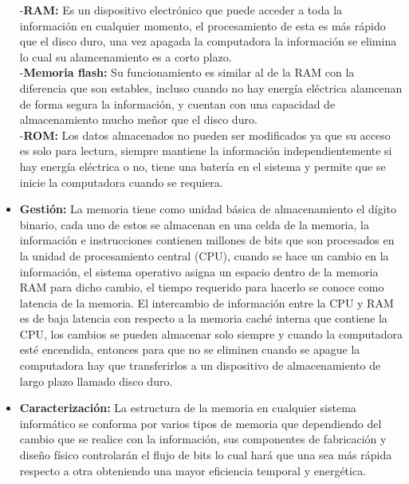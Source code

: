 \documentclass{article}
\begin{document}
\begin{flushleft}
\begin{itemize}
        -\textbf{RAM:} Es un dispositivo electrónico que puede acceder a toda la información en cualquier momento, el procesamiento de esta es más rápido que el disco duro, una vez apagada la computadora la información se elimina lo cual su alamcenamiento es a corto plazo.\\
        -\textbf{Memoria flash:} Su funcionamiento es similar al de la RAM con la diferencia que son estables, incluso cuando no hay energía eléctrica alamcenan de forma segura la información, y cuentan con una capacidad de almacenamiento mucho meñor que el disco duro.\\
        -\textbf{ROM:} Los datos almacenados no pueden ser modificados ya que su acceso es solo para lectura, siempre mantiene la información independientemente si hay energía eléctrica o no, tiene una batería en el sistema y permite que se inicie la computadora cuando se requiera.\\
        \item \textbf{Gestión:} La memoria tiene como unidad básica de almacenamiento el dígito binario, cada uno de estos se almacenan en una celda de la memoria, la información e instrucciones contienen millones de bits que son procesados en la unidad de procesamiento central (CPU), cuando se hace un cambio en la información, el sistema operativo asigna un espacio dentro de la memoria RAM para dicho cambio, el tiempo requerido para hacerlo se conoce como latencia de la memoria. El intercambio de información entre la CPU y RAM es de baja latencia con respecto a la memoria caché interna que contiene la CPU, los cambios se pueden almacenar solo siempre y cuando la computadora esté encendida, entonces para que no se eliminen cuando se apague la computadora hay que transferirlos a un dispositivo de almacenamiento de largo plazo llamado disco duro.\\
        \item \textbf{Caracterización:} La estructura de la memoria en cualquier sistema informático se conforma por varios tipos de memoria que dependiendo del cambio que se realice con la información, sus componentes de fabricación y diseño físico controlarán el flujo de bits lo cual hará que una sea más rápida respecto a otra obteniendo una mayor eficiencia temporal y energética.
        \vfill
        
    \end{itemize}
\end{flushleft}
\end{document}
